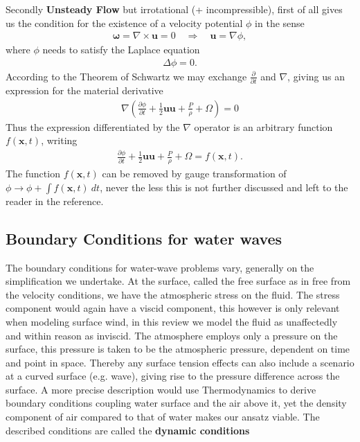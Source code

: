 Secondly \textbf{Unsteady Flow} but irrotational (+ incompressible), first of
all gives us the condition for the existence of a velocity potential $\phi$
in the sense
\begin{align}
    \mathbf{\omega} = \nabla \times  \mathbf{u} = 0  \quad \Rightarrow \quad
    \mathbf{u} = \nabla \phi,
\end{align}
where $\phi$ needs to satisfy the Laplace equation
\begin{align}
    \Delta \phi = 0.
\end{align}
According to the Theorem of Schwartz we may exchange $\frac{\partial
}{\partial t}$ and $\nabla$, giving us an expression for the material
derivative
\begin{align}
    \nabla\left( \frac{\partial \phi}{\partial t} +\frac{1}{2}
    \mathbf{u}\mathbf{u} + \frac{P}{\rho}  + \Omega \right) = 0
\end{align}
Thus the expression differentiated by the $\nabla$ operator is an arbitrary
function $f(\mathbf{x}, t)$, writing
\begin{align}
     \frac{\partial \phi}{\partial t} +\frac{1}{2}
    \mathbf{u}\mathbf{u} + \frac{P}{\rho}  + \Omega = f(\mathbf{x}, t).
\end{align}
The function $f(\mathbf{x}, t)$ can be removed by gauge transformation of
$\phi \rightarrow \phi + \int f(\mathbf{x}, t)\ dt$, never the less this is
not further discussed and left to the reader in the reference.
\subsection{Boundary Conditions for water waves}
The boundary conditions for water-wave problems vary, generally on the
simplification we undertake. At the surface, called the free surface as in
free from the velocity conditions, we have the atmospheric stress on the
fluid. The stress component would again have a viscid component, this however
is only relevant when modeling surface wind, in this review we model the
fluid as unaffectedly and within reason as inviscid. The atmosphere employs
only a pressure on the surface, this pressure is taken to be the atmospheric
pressure, dependent on time and point in space. Thereby  any surface tension
effects can also include a scenario at a curved surface (e.g. wave), giving
rise to the pressure difference across the surface. A more precise
description would use Thermodynamics to derive boundary conditions coupling
water surface and the air above it, yet the density component of air
compared to that of water makes our ansatz viable. The described conditions
are called the \textbf{dynamic conditions}

